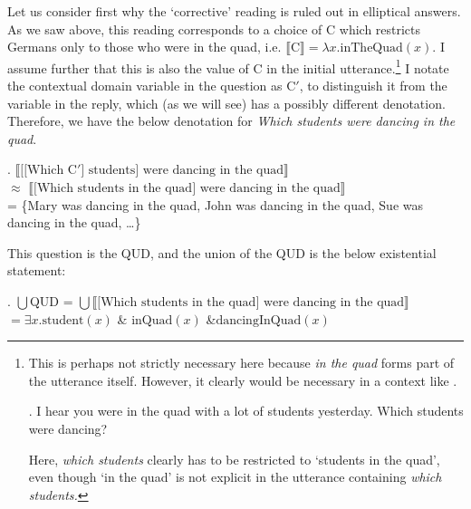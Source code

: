 \documentclass[doublespace]{umthesis}
\newcommand{\ext}[1]{\ensuremath{\llbracket \textrm{{#1}} \rrbracket}}
\newcommand{\pred}[1]{\ensuremath{\mathrm{{#1}}}}
\begin{document}
Let us consider first why the `corrective' reading is ruled out in elliptical answers.
As we saw above, this reading corresponds to a choice of C which restricts Germans only to those who were in the quad, i.e. $\ext{C} = \lambda x. \pred{inTheQuad}(x)$.
I assume further that this is also the value of C in the initial utterance.\footnote{This is perhaps not strictly necessary here because {\it in the quad} forms part of the utterance itself.
However, it clearly would be necessary in a context like \Next.

\ex. 	I hear you were in the quad with a lot of students yesterday.
	Which students were dancing?
	
Here, {\it which students} clearly has to be restricted to `students in the quad', even though `in the quad' is not explicit in the utterance containing {\it which students.}}
I notate the contextual domain variable in the question as C$'$, to distinguish it from the variable in the reply, which (as we will see) has a possibly different denotation.
Therefore, we have the below denotation for {\it Which students were dancing in the quad}.

\ex. 	\ext{[[Which C$'$] students] were dancing in the quad}\\
	$\approx$ \ext{[Which students in the quad] were dancing in the quad}\\
	= \{Mary was dancing in the quad, John was dancing in the quad, Sue was dancing in the quad, \ldots\}
	
This question is the QUD, and the union of the QUD is the below existential statement:

\ex.	$\bigcup$QUD = $\bigcup$\ext{[Which students in the quad] were dancing in the quad}\\
	$= \exists x. \pred{student}(x) $ \& $\pred{inQuad}(x)$ \&$ \pred{dancingInQuad}(x)$
	
\end{document}

